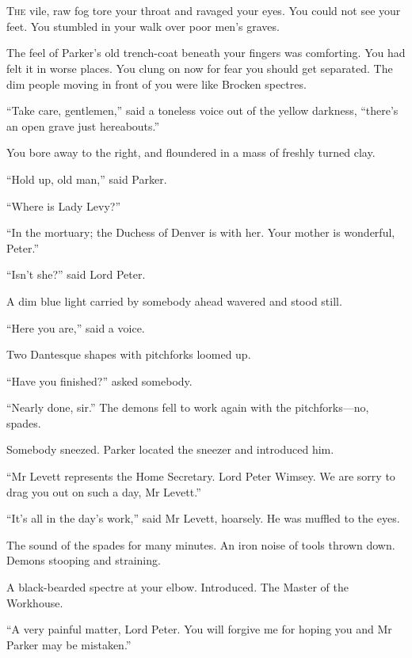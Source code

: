 \chapter[Chapter \thechapter]{}
\lettrine[lines=4]{T}{he} vile, raw fog tore your throat and ravaged your eyes. You could not see your feet. You stumbled in your walk over poor men’s graves.

The feel of Parker’s old trench-coat beneath your fingers was comforting. You had felt it in worse places. You clung on now for fear you should get separated. The dim people moving in front of you were like Brocken spectres.

\enquote{Take care, gentlemen,} said a toneless voice out of the yellow darkness, \enquote{there’s an open grave just hereabouts.}

You bore away to the right, and floundered in a mass of freshly turned clay.

\enquote{Hold up, old man,} said Parker.

\enquote{Where is Lady Levy?}

\enquote{In the mortuary; the Duchess of Denver is with her. Your mother is wonderful, Peter.}

\enquote{Isn’t she?} said Lord Peter.

A dim blue light carried by somebody ahead wavered and stood still.

\enquote{Here you are,} said a voice.

Two Dantesque shapes with pitchforks loomed up.

\enquote{Have you finished?} asked somebody.

\enquote{Nearly done, sir.} The demons fell to work again with the pitchforks\allowbreak---\allowbreak no, spades.

Somebody sneezed. Parker located the sneezer and introduced him.

\enquote{Mr Levett represents the Home Secretary. Lord Peter Wimsey. We are sorry to drag you out on such a day, Mr Levett.}

\enquote{It’s all in the day’s work,} said Mr Levett, hoarsely. He was muffled to the eyes.

The sound of the spades for many minutes. An iron noise of tools thrown down. Demons stooping and straining.

A black-bearded spectre at your elbow. Introduced. The Master of the Workhouse.

\enquote{A very painful matter, Lord Peter. You will forgive me for hoping you and Mr Parker may be mistaken.}

